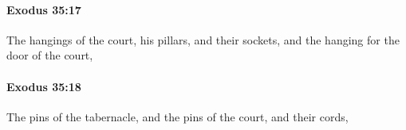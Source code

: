 		\paragraph{Exodus 35:17} %
			\label{EXODUS-35-17}

			The hangings of the court, his pillars, and their sockets, and the hanging for the door of the court,


		\paragraph{Exodus 35:18} %
			\label{EXODUS-35-18}

			The pins of the tabernacle, and the pins of the court, and their cords,


